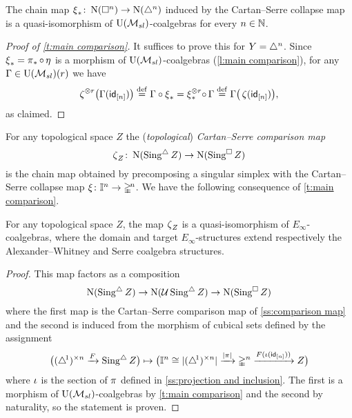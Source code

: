\begin{lemma} \label{l:main comparison}
	The chain map $\operatorname{\xi}_\ast \colon \operatorname{N}(\square^n) \to \operatorname{N}(\triangle^n)$ induced by the Cartan--Serre collapse map is a quasi-isomorphism of ${\operatorname{U}(\mathcal{M}_{sl})}$-coalgebras for every $n \in \mathbb{N}$.
\end{lemma}

\begin{proof}[Proof of \cref{t:main comparison}]
	It suffices to prove this for $Y = \triangle^n$.
	Since $\operatorname{\xi}_\ast = \operatorname{\pi}_\ast \circ \operatorname{\eta}$ is a morphism of ${\operatorname{U}(\mathcal{M}_{sl})}$-coalgebras (\cref{l:main comparison}), for any $\Gamma \in {\operatorname{U}(\mathcal{M}_{sl})}(r)$ we have
	\begin{align*}
	\operatorname{\zeta}^{\otimes r} \! \big( \Gamma(\mathsf{id}_{[n]}) \big) \stackrel{\mathrm{def}}{=}
	\Gamma \circ \operatorname{\xi}_\ast =
	\operatorname{\xi}_\ast^{\otimes r} \! \circ \, \Gamma \stackrel{\mathrm{def}}{=}
	\Gamma \big( \operatorname{\zeta} (\mathsf{id}_{[n]}) \big),
	\end{align*}
	as claimed.
\end{proof}

For any topological space $Z$ the (\textit{topological}) \textit{Cartan--Serre comparison map}
\[
\operatorname{\zeta}_Z \colon \operatorname{N}(\operatorname{Sing^{\triangle}} Z) \to \operatorname{N}(\operatorname{Sing^{\square}} Z)
\]
is the chain map obtained by precomposing a singular simplex with the Cartan--Serre collapse map $\operatorname{\xi} \colon \mathbb{I}^n \to \mathbb{\Delta}^{\!n}$.
We have the following consequence of \cref{t:main comparison}.

\begin{corollary} \label{t:topological comparison}
	For any topological space $Z$, the map $\operatorname{\zeta}_Z$ is a quasi-isomorphism of $E_\infty$-coalgebras, where the domain and target $E_\infty$-structures extend respectively the Alexander--Whitney and Serre coalgebra structures.
\end{corollary}

\begin{proof}
	This map factors as a composition
	\[
	\operatorname{N}(\operatorname{Sing^{\triangle}} Z) \to \operatorname{N}(\operatorname{\mathcal{U}} \operatorname{Sing^{\triangle}} Z) \to \operatorname{N}(\operatorname{Sing^{\square}} Z)
	\]
	where the first map is the Cartan--Serre comparison map of \cref{ss:comparison map} and the second is induced from the morphism of cubical sets defined by the assignment
	\[
	\big( (\triangle^{\!1})^{\times n} \xrightarrow{F} \operatorname{Sing^{\triangle}} Z \big) \mapsto
	\big( \mathbb{I}^n \cong \lvert(\triangle^{\!1})^{\times n}\rvert \xrightarrow{\lvert\operatorname{\pi}\rvert} \mathbb{\Delta}^n \xrightarrow{F(\operatorname{\iota}(\mathsf{id}_{[n]}))} Z \big)
	\]
	where $\operatorname{\iota}$ is the section of $\operatorname{\pi}$ defined in \cref{ss:projection and inclusion}.
	The first is a morphism of ${\operatorname{U}(\mathcal{M}_{sl})}$-coalgebras by \cref{t:main comparison} and the second by naturality, so the statement is proven.
\end{proof}


